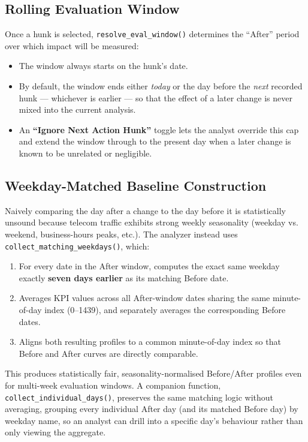 \subsection{Rolling Evaluation Window}
Once a hunk is selected, \texttt{resolve\_eval\_window()} determines the
``After'' period over which impact will be measured:

\begin{itemize}
    \item The window always starts on the hunk's date.
    \item By default, the window ends either \emph{today} or the day
        before the \emph{next} recorded hunk --- whichever is earlier ---
        so that the effect of a later change is never mixed into the
        current analysis.
    \item An \textbf{``Ignore Next Action Hunk''} toggle lets the analyst
        override this cap and extend the window through to the present
        day when a later change is known to be unrelated or negligible.
\end{itemize}

\subsection{Weekday-Matched Baseline Construction}
Naively comparing the day after a change to the day before it is
statistically unsound because telecom traffic exhibits strong weekly
seasonality (weekday vs. weekend, business-hours peaks, etc.). The
analyzer instead uses \texttt{collect\_matching\_weekdays()}, which:

\begin{enumerate}
    \item For every date in the After window, computes the exact
        same weekday exactly \textbf{seven days earlier} as its
        matching Before date.
    \item Averages KPI values across all After-window dates sharing the
        same minute-of-day index (0--1439), and separately averages the
        corresponding Before dates.
    \item Aligns both resulting profiles to a common minute-of-day
        index so that Before and After curves are directly comparable.
\end{enumerate}

This produces statistically fair, seasonality-normalised Before/After
profiles even for multi-week evaluation windows. A companion function,
\texttt{collect\_individual\_days()}, preserves the same matching logic
without averaging, grouping every individual After day (and its matched
Before day) by weekday name, so an analyst can drill into a specific
day's behaviour rather than only viewing the aggregate.

